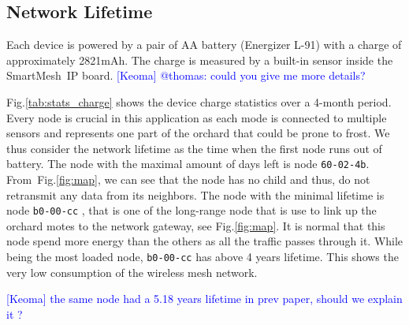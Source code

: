 \documentclass{sig-alternate}
\newcommand{\keoma}[1]       {\textcolor{blue}{[Keoma] #1}}
\newcommand{\smip}           {SmartMesh~IP\xspace}
\begin{document}
\subsection{Network Lifetime}
\label{sec:charge}


Each device is powered by a pair of AA battery (Energizer L-91) with a charge of approximately 2821mAh.
The charge is measured by a built-in sensor inside the \smip board. \keoma{@thomas: could you give me more details?}


Fig.\ref{tab:stats_charge} shows the device charge statistics over a 4-month period.
Every node is crucial in this application as each mode is connected to multiple sensors and represents one part of the orchard that could be prone to frost.
We thus consider the network lifetime as the time when the first node runs out of battery.
The node with the maximal amount of days left is node {\tt 60-02-4b}.
From~Fig.\ref{fig:map}, we can see that the node has no child and thus, do not retransmit any data from its neighbors.
The node with the minimal lifetime is node {\tt b0-00-cc} , that is one of the long-range node that is use to link up the orchard motes to the network gateway, see Fig.\ref{fig:map}.
It is normal that this node spend more energy than the others as all the traffic passes through it.
While being the most loaded node, {\tt b0-00-cc} has above 4 years lifetime.
This shows the very low consumption of the wireless mesh network.

\keoma{the same node had a 5.18 years lifetime in prev paper, should we explain it ?}
\end{document}
